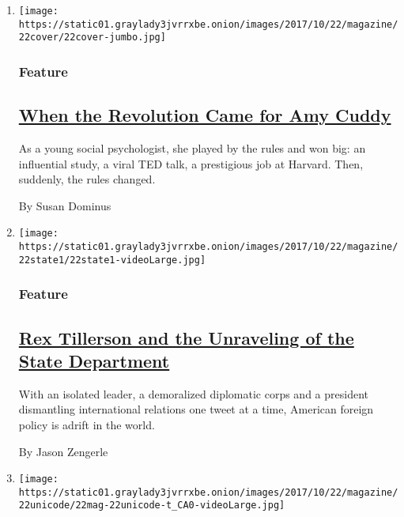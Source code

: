 \begin{enumerate}
\def\labelenumi{\arabic{enumi}.}
\item
  \texttt{[image: https://static01.graylady3jvrrxbe.onion/images/2017/10/22/magazine/22cover/22cover-jumbo.jpg]}

  \hypertarget{feature}{%
  \subsubsection{Feature}\label{feature}}

  \hypertarget{when-the-revolution-came-for-amy-cuddy}{%
  \subsection{\texorpdfstring{\href{/2017/10/18/magazine/when-the-revolution-came-for-amy-cuddy.html}{When
  the Revolution Came for Amy
  Cuddy}}{When the Revolution Came for Amy Cuddy}}\label{when-the-revolution-came-for-amy-cuddy}}

  As a young social psychologist, she played by the rules and won big:
  an influential study, a viral TED talk, a prestigious job at Harvard.
  Then, suddenly, the rules changed.

  By Susan Dominus
\item
  \texttt{[image: https://static01.graylady3jvrrxbe.onion/images/2017/10/22/magazine/22state1/22state1-videoLarge.jpg]}

  \hypertarget{feature-1}{%
  \subsubsection{Feature}\label{feature-1}}

  \hypertarget{rex-tillerson-and-the-unraveling-of-the-state-department}{%
  \subsection{\texorpdfstring{\href{/2017/10/17/magazine/rex-tillerson-and-the-unraveling-of-the-state-department.html}{Rex
  Tillerson and the Unraveling of the State
  Department}}{Rex Tillerson and the Unraveling of the State Department}}\label{rex-tillerson-and-the-unraveling-of-the-state-department}}

  With an isolated leader, a demoralized diplomatic corps and a
  president dismantling international relations one tweet at a time,
  American foreign policy is adrift in the world.

  By Jason Zengerle
\item
  \texttt{[image: https://static01.graylady3jvrrxbe.onion/images/2017/10/22/magazine/22unicode/22mag-22unicode-t\_CA0-videoLarge.jpg]}


\end{enumerate}
